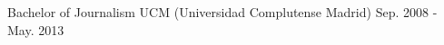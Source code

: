

\begin{cventries}

  \cventry
    {Bachelor of Journalism} %
    {UCM (Universidad Complutense Madrid)} %
    {} %
    {Sep. 2008 - May. 2013} %
    {
    }

\end{cventries}
